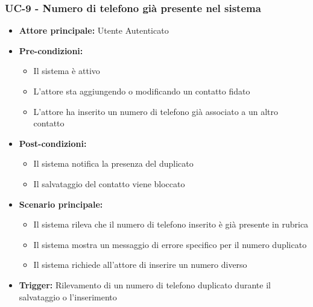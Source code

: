 \documentclass[a4paper,12pt]{article}
\begin{document}
\subsubsection{UC-9 - Numero di telefono già presente nel sistema} \label{subsec:UC-9}
\begin{itemize}
    \item \textbf{Attore principale:} Utente Autenticato
    \item \textbf{Pre-condizioni:}
    \begin{itemize}
        \item Il sistema è attivo
        \item L'attore sta aggiungendo o modificando un contatto fidato
        \item L'attore ha inserito un numero di telefono già associato a un altro contatto
    \end{itemize}
    \item \textbf{Post-condizioni:}
    \begin{itemize}
        \item Il sistema notifica la presenza del duplicato
        \item Il salvataggio del contatto viene bloccato
    \end{itemize}
    \item \textbf{Scenario principale:}
    \begin{itemize}
        \item Il sistema rileva che il numero di telefono inserito è già presente in rubrica
        \item Il sistema mostra un messaggio di errore specifico per il numero duplicato
        \item Il sistema richiede all'attore di inserire un numero diverso
    \end{itemize}
    \item \textbf{Trigger:} Rilevamento di un numero di telefono duplicato durante il salvataggio o l'inserimento
\end{itemize}
\end{document}

